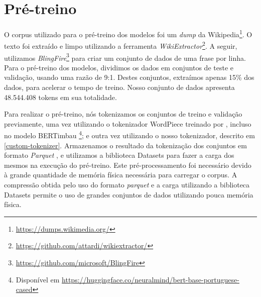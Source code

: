 \documentclass[cic,tc]{iiufrgs}
\begin{document}
\section{Pré-treino}\label{mlm}
O corpus utilizado para o pré-treino dos modelos foi um \emph{dump} da Wikipedia\footnote{\url{https://dumps.wikimedia.org/}}. O texto foi extraído e limpo utilizando a ferramenta \emph{WikiExtractor}\footnote{\url{https://github.com/attardi/wikiextractor/}}. A seguir, utilizamos \emph{BlingFire}\footnote{\url{https://github.com/microsoft/BlingFire}} para criar um conjunto de dados de uma frase por linha. Para o pré-treino dos modelos, dividimos os dados em conjuntos de teste e validação, usando uma razão de 9:1. Destes conjuntos, extraímos apenas 15\% dos dados, para acelerar o tempo de treino. Nosso conjunto de dados apresenta 48.544.408 tokens em sua totalidade.

Para realizar o pré-treino, nós tokenizamos os conjuntos de treino e validação previamente, uma vez utilizando o tokenizador WordPiece treinado por \citet{souza2020}, incluso no modelo BERTimbau \footnote{Disponível em \url{https://huggingface.co/neuralmind/bert-base-portuguese-cased}}; e outra vez utilizando o nosso tokenizador, descrito em \ref{custom-tokenizer}. Armazenamos o resultado da tokenização dos conjuntos em formato \emph{Parquet} \cite{parquet}, e utilizamos a biblioteca Datasets para fazer a carga dos mesmos na execução do pré-treino. Este pré-processamento foi necessário devido à grande quantidade de memória física necessária para carregar o corpus. A compressão obtida pelo uso do formato \emph{parquet} e a carga utilizando a biblioteca Datasets permite o uso de grandes conjuntos de dados utilizando pouca memória física.
\end{document}
